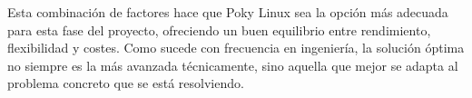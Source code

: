     Esta combinación de factores hace que Poky Linux sea la opción más adecuada para esta fase del proyecto, ofreciendo un buen equilibrio entre rendimiento, flexibilidad y costes. Como sucede con frecuencia en ingeniería, la solución óptima no siempre es la más avanzada técnicamente, sino aquella que mejor se adapta al problema concreto que se está resolviendo.
